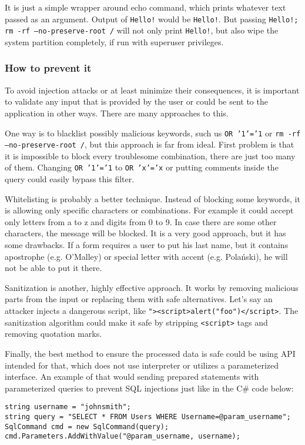 \documentclass[a4paper]{article}
\begin{document}
It is just a simple wrapper around echo command, which prints whatever text
passed as an argument. Output of \texttt{Hello!} would be \texttt{Hello!}.
But passing \texttt{Hello!; rm -rf --no-preserve-root /} will not only print
\texttt{Hello!}, but also wipe the system partition completely, if run with 
superuser privileges.

\subsubsection{How to prevent it}

To avoid injection attacks or at least minimize their consequences, it is
important to validate any input that is provided by the user or could be sent to
the application in other ways. There are many approaches to this.

One way is to blacklist possibly malicious keywords, such us \texttt{OR '1'='1}
or \texttt{rm -rf --no-preserve-root /}, but this approach is far from ideal.
First problem is that it is impossible to block every troublesome combination,
there are just too many of them. Changing \texttt{OR '1'='1} to \texttt{OR
'x'='x} or putting comments inside the query could easily bypass this filter.

Whitelisting is probably a better technique. Instead of blocking some keywords,
it is allowing only specific characters or combinations. For example it could
accept only letters from a to z and digits from 0 to 9. In case there are some
other characters, the message will be blocked. It is a very good approach, but
it has some drawbacks. If a form requires a user to put his last name, but it
contains apostrophe (e.g. O'Malley) or special letter with accent (e.g.
Polański), he will not be able to put it there.

Sanitization is another, highly effective approach. It works by removing
malicious parts from the input or replacing them with safe alternatives. Let's
say an attacker injects a dangerous script, like
\texttt{"><script>alert("foo")</script>}. The sanitization algorithm could make
it safe by stripping \texttt{<script>} tags and removing quotation marks.

Finally, the best method to ensure the processed data is safe could be using
API intended for that, which does not use interpreter or utilizes a
parameterized interface. An example of that would sending prepared statements
with parameterized queries to prevent SQL injections just like in the C\# code
below:

\begin{verbatim}
string username = "johnsmith";
string query = "SELECT * FROM Users WHERE Username=@param_username";
SqlCommand cmd = new SqlCommand(query);
cmd.Parameters.AddWithValue("@param_username, username);
\end{verbatim}
\end{document}

